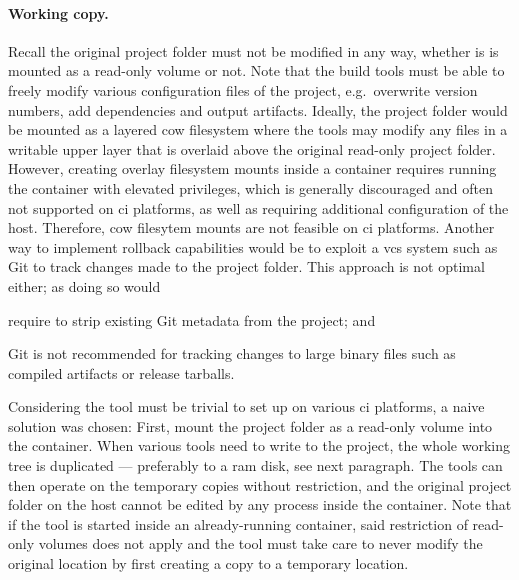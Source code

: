 \paragraph{Working copy.} Recall the original project folder must not be modified in any way, whether is is mounted as a read-only volume or not. Note that the build tools must be able to freely modify various configuration files of the project, e.g.~overwrite version numbers, add dependencies and output artifacts.
Ideally, the project folder would be mounted as a layered \acrfull{cow} filesystem where the tools may modify any files in a writable upper layer that is overlaid above the original read-only project folder. However, creating overlay filesystem mounts inside a container requires running the container with elevated privileges, which is generally discouraged and often not supported on \acrshort{ci} platforms, as well as requiring additional configuration of the host. Therefore, \acrshort{cow} filesytem mounts are not feasible on \acrshort{ci} platforms. Another way to implement rollback capabilities would be to exploit a \acrfull{vcs} system such as Git to track changes made to the project folder. This approach is not optimal either; as doing so would \begin{enumerate*}[label=(\roman*)]
  \item require to strip existing Git metadata from the project; and
  \item Git is not recommended for tracking changes to large binary files such as compiled artifacts or release tarballs.
\end{enumerate*}

Considering the tool must be trivial to set up on various \acrshort{ci} platforms, a naive solution was chosen: First, mount the project folder as a read-only volume into the container. When various tools need to write to the project, the whole working tree is duplicated --- preferably to a \acrshort{ram} disk, see next paragraph. The tools can then operate on the temporary copies without restriction, and the original project folder on the host cannot be edited by any process inside the container. Note that if the tool is started inside an already-running container, said restriction of read-only volumes does not apply and the tool must take care to never modify the original location by first creating a copy to a temporary location.


